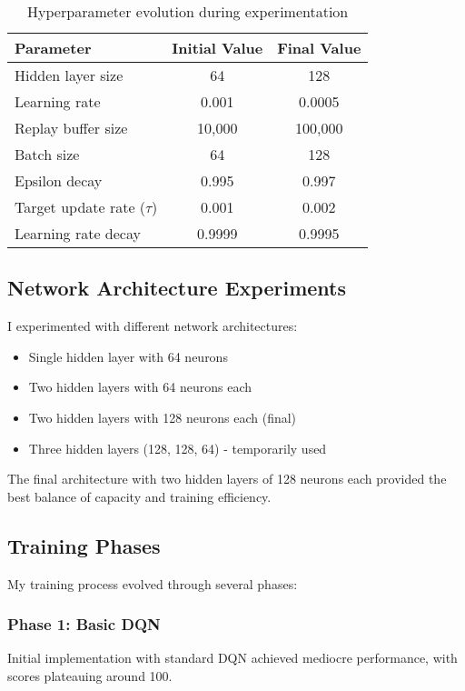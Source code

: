 \documentclass[11pt,a4paper]{article}
\begin{document}
\begin{table}[H]
\centering
\begin{tabular}{@{}lcc@{}}
\toprule
\textbf{Parameter} & \textbf{Initial Value} & \textbf{Final Value} \\
\midrule
Hidden layer size & 64 & 128 \\
Learning rate & 0.001 & 0.0005 \\
Replay buffer size & 10,000 & 100,000 \\
Batch size & 64 & 128 \\
Epsilon decay & 0.995 & 0.997 \\
Target update rate ($\tau$) & 0.001 & 0.002 \\
Learning rate decay & 0.9999 & 0.9995 \\
\bottomrule
\end{tabular}
\caption{Hyperparameter evolution during experimentation}
\label{tab:hyperparams}
\end{table}

\subsection{Network Architecture Experiments}

I experimented with different network architectures:
\begin{itemize}
    \item Single hidden layer with 64 neurons
    \item Two hidden layers with 64 neurons each
    \item Two hidden layers with 128 neurons each (final)
    \item Three hidden layers (128, 128, 64) - temporarily used
\end{itemize}

The final architecture with two hidden layers of 128 neurons each provided the best balance of capacity and training efficiency.

\subsection{Training Phases}

My training process evolved through several phases:

\subsubsection{Phase 1: Basic DQN}
Initial implementation with standard DQN achieved mediocre performance, with scores plateauing around 100.
\end{document}
